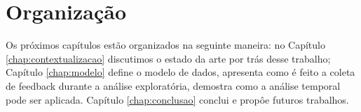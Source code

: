 \section{Organização}

Os próximos capítulos estão organizados na seguinte maneira: no Capítulo \ref{chap:contextualizacao} discutimos o estado da arte por trás desse trabalho; Capítulo \ref{chap:modelo} define o modelo de dados, apresenta como é feito a coleta de feedback durante a análise exploratória, demostra como a análise temporal pode ser aplicada. Capítulo \ref{chap:conclusao} conclui e propôe futuros trabalhos.
